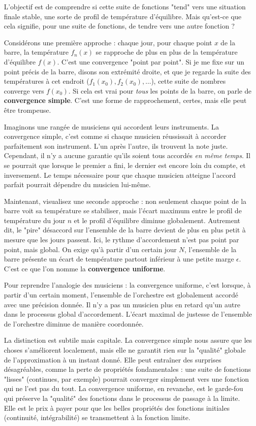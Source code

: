 \documentclass{report}
\begin{document}
L'objectif est de comprendre si cette suite de fonctions "tend" vers une situation finale stable, une sorte de profil de température d'équilibre. Mais qu'est-ce que cela signifie, pour une suite de fonctions, de tendre vers une autre fonction ?

Considérons une première approche : chaque jour, pour chaque point $x$ de la barre, la température $f_n(x)$ se rapproche de plus en plus de la température d'équilibre $f(x)$. C'est une convergence "point par point". Si je me fixe sur un point précis de la barre, disons son extrémité droite, et que je regarde la suite des températures à cet endroit ($f_1(x_0), f_2(x_0), \dots$), cette suite de nombres converge vers $f(x_0)$. Si cela est vrai pour \textit{tous} les points de la barre, on parle de \textbf{convergence simple}. C'est une forme de rapprochement, certes, mais elle peut être trompeuse.

Imaginons une rangée de musiciens qui accordent leurs instruments. La convergence simple, c'est comme si chaque musicien réussissait à accorder parfaitement son instrument. L'un après l'autre, ils trouvent la note juste. Cependant, il n'y a aucune garantie qu'ils soient tous accordés \textit{en même temps}. Il se pourrait que lorsque le premier a fini, le dernier est encore loin du compte, et inversement. Le temps nécessaire pour que chaque musicien atteigne l'accord parfait pourrait dépendre du musicien lui-même.

Maintenant, visualisez une seconde approche : non seulement chaque point de la barre voit sa température se stabiliser, mais l'écart maximum entre le profil de température du jour $n$ et le profil d'équilibre diminue globalement. Autrement dit, le "pire" désaccord sur l'ensemble de la barre devient de plus en plus petit à mesure que les jours passent. Ici, le rythme d'accordement n'est pas point par point, mais global. On exige qu'à partir d'un certain jour $N$, l'ensemble de la barre présente un écart de température partout inférieur à une petite marge $\epsilon$. C'est ce que l'on nomme la \textbf{convergence uniforme}.

Pour reprendre l'analogie des musiciens : la convergence uniforme, c'est lorsque, à partir d'un certain moment, l'ensemble de l'orchestre est globalement accordé avec une précision donnée. Il n'y a pas un musicien plus en retard qu'un autre dans le processus global d'accordement. L'écart maximal de justesse de l'ensemble de l'orchestre diminue de manière coordonnée.

La distinction est subtile mais capitale. La convergence simple nous assure que les choses s'améliorent localement, mais elle ne garantit rien sur la "qualité" globale de l'approximation à un instant donné. Elle peut entraîner des surprises désagréables, comme la perte de propriétés fondamentales : une suite de fonctions "lisses" (continues, par exemple) pourrait converger simplement vers une fonction qui ne l'est pas du tout. La convergence uniforme, en revanche, est le garde-fou qui préserve la "qualité" des fonctions dans le processus de passage à la limite. Elle est le prix à payer pour que les belles propriétés des fonctions initiales (continuité, intégrabilité) se transmettent à la fonction limite.
\end{document}
